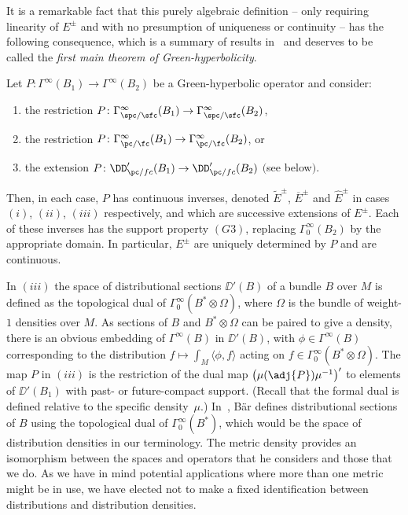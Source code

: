  It is a remarkable fact that this purely algebraic definition -- only requiring linearity of $E^\pm$ and with no presumption of uniqueness or continuity -- has the following consequence, which is a summary of results in~\cite[Sections 3 and 4]{Baer:2015} and deserves to be called the \emph{first main theorem of Green-hyperbolicity}.
 \begin{Theorem}\label{thm:GHbasics}
 	Let $P\colon\Gamma^\infty(B_1)\to \Gamma^\infty(B_2)$ be a Green-hyperbolic operator and consider:
 	\begin{enumerate}\renewcommand{\theenumi}{(\roman{enumi})}\itemsep=0pt
 		\item[$(i)$] the restriction $P\colon\Gamma^\infty_{\spc/\sfc}(B_1)\to\Gamma^\infty_{\spc/\sfc}(B_2)$,
 		\item[$(ii)$] the restriction $P\colon\Gamma^\infty_{\pc/\fc}(B_1)\to\Gamma^\infty_{\pc/\fc}(B_2)$, or
 		\item[$(iii)$] the extension $P\colon\DD'_{\pc/fc}(B_1)\to\DD'_{\pc/fc}(B_2)$ $($see below$)$.
 	\end{enumerate}
 	Then, in each case, $P$ has continuous inverses, denoted
 	$\tilde{E}^\pm$, $\overline{E}^\pm$ and $\widehat{E}^\pm$ in cases
 	$(i)$, $(ii)$, $(iii)$ respectively, and which are successive extensions of $E^\pm$. Each of these inverses has the support property $(G3)$, replacing
 	$\Gamma_0^\infty(B_2)$ by the appropriate domain. In particular,
 	$E^\pm$ are uniquely determined by $P$ and are continuous.
 \end{Theorem}	
 In $(iii)$ the space of distributional sections $\DD'(B)$ of a bundle $B$ over $M$ is defined
 as the topological dual of $\Gamma_0^\infty(B^*\otimes\Omega)$, where $\Omega$ is the bundle of weight-$1$ densities over $M$. As sections of $B$ and $B^*\otimes\Omega$ can be paired to give a density, there is an obvious embedding of $\Gamma^\infty(B)$ in $\DD'(B)$, with $\phi\in\Gamma^\infty(B)$ corresponding to the distribution
 $f\mapsto \int_M \langle \phi,f\rangle$ acting on $f\in \Gamma_0^\infty(B^*\otimes\Omega)$.
 The map $P$ in $(iii)$ is the restriction of the dual map
 $\big(\mu(\adj{P})\mu^{-1}\big)'$ to elements of $\DD'(B_1)$ with past- or future-compact support.
 (Recall that the formal dual is defined relative to the specific density~$\mu$.)
 In~\cite{Baer:2015}, B\"ar defines distributional sections of $B$ using
 the topological dual of $\Gamma_0^\infty(B^*)$, which would be the space of distribution densities in our terminology. The metric density
 provides an isomorphism between the spaces and operators that he considers and those that we do. As we have in mind potential applications where more than one metric might be in use, we have elected not to make a fixed identification between distributions and distribution densities.

